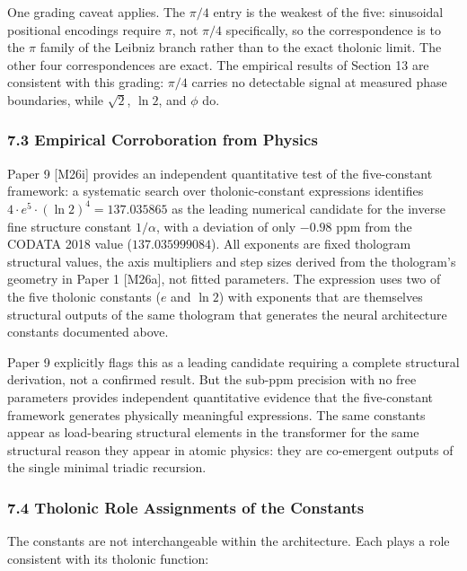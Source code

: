 \documentclass[
  11pt,
  letterpaper,
]{article}
\begin{document}
One grading caveat applies. The \(\pi/4\) entry is the weakest of the
five: sinusoidal positional encodings require \(\pi\), not \(\pi/4\)
specifically, so the correspondence is to the \(\pi\) family of the
Leibniz branch rather than to the exact tholonic limit. The other four
correspondences are exact. The empirical results of Section 13 are
consistent with this grading: \(\pi/4\) carries no detectable signal at
measured phase boundaries, while \(\sqrt{2}\), \(\ln 2\), and \(\phi\)
do.

\subsubsection{7.3 Empirical Corroboration from
Physics}\label{empirical-corroboration-from-physics}

Paper 9 {[}M26i{]} provides an independent quantitative test of the
five-constant framework: a systematic search over tholonic-constant
expressions identifies \(4 \cdot e^5 \cdot (\ln 2)^4 = 137.035865\) as
the leading numerical candidate for the inverse fine structure constant
\(1/\alpha\), with a deviation of only \(-0.98\) ppm from the CODATA
2018 value (\(137.035999084\)). All exponents are fixed thologram
structural values, the axis multipliers and step sizes derived from the
thologram's geometry in Paper 1 {[}M26a{]}, not fitted parameters. The
expression uses two of the five tholonic constants (\(e\) and \(\ln 2\))
with exponents that are themselves structural outputs of the same
thologram that generates the neural architecture constants documented
above.

Paper 9 explicitly flags this as a leading candidate requiring a
complete structural derivation, not a confirmed result. But the sub-ppm
precision with no free parameters provides independent quantitative
evidence that the five-constant framework generates physically
meaningful expressions. The same constants appear as load-bearing
structural elements in the transformer for the same structural reason
they appear in atomic physics: they are co-emergent outputs of the
single minimal triadic recursion.

\subsubsection{7.4 Tholonic Role Assignments of the
Constants}\label{tholonic-role-assignments-of-the-constants}

The constants are not interchangeable within the architecture. Each
plays a role consistent with its tholonic function:
\end{document}
